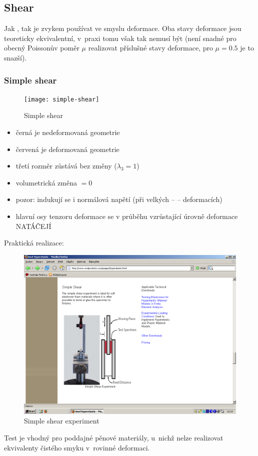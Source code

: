 
\subsection{Shear}
Jak , tak  je zvykem používat ve smyslu deformace. Oba stavy deformace jsou teoreticky ekvivalentní, v~praxi tomu však tak nemusí být (není snadné pro obecný Poissonův poměr $\mu$ realizovat příslušné stavy deformace, pro $\mu = \num{0.5}$ je to snazší).

\subsubsection{Simple shear}
\begin{figure}[H]
	\centering
	\texttt{[image: simple-shear]}
	\caption{Simple shear}
	\label{fig:simple-shear}
\end{figure}

\begin{itemize}
	\item černá je nedeformovaná geometrie
	\item červená je deformovaná geometrie
	\item třetí rozměr zůstává bez změny ($\lambda_3 = 1$)
	\item volumetrická změna $= 0$
	\item pozor: indukují se i normálová napětí (při velkých --  -- deformacích)
	\item hlavní osy tenzoru deformace se v průběhu vzrůstající úrovně deformace NATÁČEJÍ
\end{itemize}

Praktická realizace:
\begin{figure}[H]
	\centering
	\includegraphics[width=0.4\linewidth]{Obrazky/simple-shear-experiment}
	\caption{Simple shear experiment}
	\label{fig:simple-shear-experiment}
\end{figure}
Test je vhodný pro poddajné pěnové materiály, u~nichž nelze realizovat ekvivalenty čistého smyku v~rovinné deformaci.

